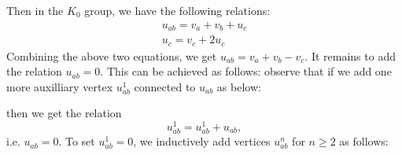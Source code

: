\documentclass[a4paper,11pt,reqno]{amsart}
\newcommand {\edge}[2] {\draw [->] (#1) -- ($ (#1) ! .5 ! (#2) $); \draw[] ($ (#1) ! .5 ! (#2) $) -- (#2); }
\newcommand {\bigloop}[1] {\draw [->] (#1) arc (270:90:.3); \draw (#1) arc (270: 450: .3);}
\newcommand {\labelpoint} [4] {\filldraw [fill = white] (#1) node[xshift = #2pt, yshift = #3pt] {$#4$} circle (1.5pt);}
\theoremstyle{plain}
\theoremstyle{named}
\numberwithin{equation}{section}
\begin{document}
                            Then in the $K_{0}$ group, we have the following relations:
                            \begin{eqnarray}
                              u_{ab}=v_{a}+v_{b}+u_{c}\\
                                u_{c}=v_{c}+2u_{c}  
                            \end{eqnarray}
                            Combining the above two equations, we get $u_{ab}=v_{a}+v_{b}-v_{c}$. It remains to add the relation $u_{ab}=0$. This can be achieved as follows: observe that if we add one more auxilliary vertex $u_{ab}^{1}$ connected to $u_{ab}$ as below: 
\begin {center}
\end {center}
\vspace {20pt}
                            then we get the relation
                            \begin{displaymath}
                                u^{1}_{ab}=u_{ab}^{1}+u_{ab},
                            \end{displaymath}
                            i.e. $u_{ab}=0$. To set $u_{ab}^{1}=0$, we inductively add vertices $u^{n}_{ab}$ for $n\geq 2$ as follows:
\begin {center}
\end {center}
\vspace {20pt}
\end{document}
